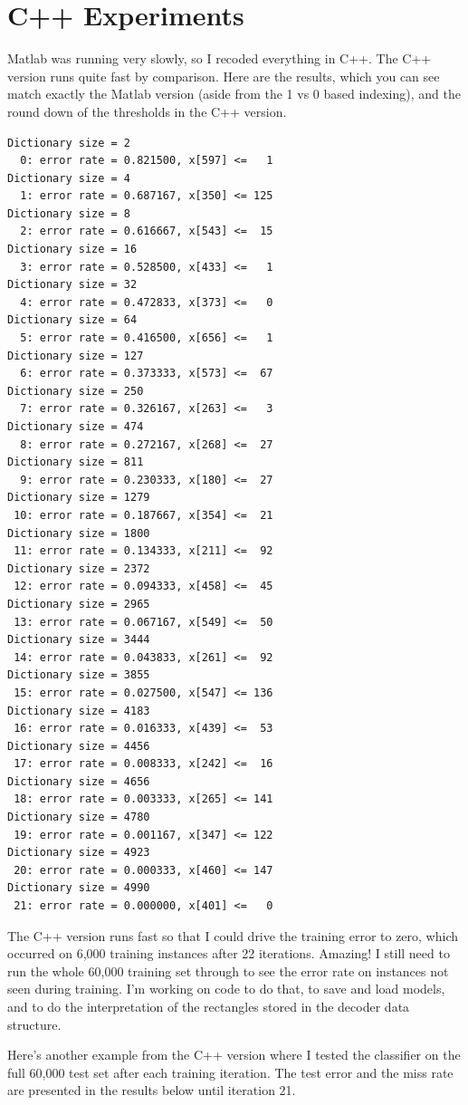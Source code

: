 \documentclass{article}
\begin{document}
\section{C++ Experiments}

Matlab was running very slowly, so I recoded everything in C++.  The C++ version runs quite fast by comparison.  Here are the results, which you can see match exactly the Matlab version (aside from the 1 vs 0 based indexing), and the round down of the thresholds in the C++ version.

\begin{verbatim}
Dictionary size = 2
  0: error rate = 0.821500, x[597] <=   1
Dictionary size = 4
  1: error rate = 0.687167, x[350] <= 125
Dictionary size = 8
  2: error rate = 0.616667, x[543] <=  15
Dictionary size = 16
  3: error rate = 0.528500, x[433] <=   1
Dictionary size = 32
  4: error rate = 0.472833, x[373] <=   0
Dictionary size = 64
  5: error rate = 0.416500, x[656] <=   1
Dictionary size = 127
  6: error rate = 0.373333, x[573] <=  67
Dictionary size = 250
  7: error rate = 0.326167, x[263] <=   3
Dictionary size = 474
  8: error rate = 0.272167, x[268] <=  27
Dictionary size = 811
  9: error rate = 0.230333, x[180] <=  27
Dictionary size = 1279
 10: error rate = 0.187667, x[354] <=  21
Dictionary size = 1800
 11: error rate = 0.134333, x[211] <=  92
Dictionary size = 2372
 12: error rate = 0.094333, x[458] <=  45
Dictionary size = 2965
 13: error rate = 0.067167, x[549] <=  50
Dictionary size = 3444
 14: error rate = 0.043833, x[261] <=  92
Dictionary size = 3855
 15: error rate = 0.027500, x[547] <= 136
Dictionary size = 4183
 16: error rate = 0.016333, x[439] <=  53
Dictionary size = 4456
 17: error rate = 0.008333, x[242] <=  16
Dictionary size = 4656
 18: error rate = 0.003333, x[265] <= 141
Dictionary size = 4780
 19: error rate = 0.001167, x[347] <= 122
Dictionary size = 4923
 20: error rate = 0.000333, x[460] <= 147
Dictionary size = 4990
 21: error rate = 0.000000, x[401] <=   0
\end{verbatim}

The C++ version runs fast so that I could drive the training error to zero, which occurred on 6,000 training instances after 22 iterations.  Amazing!   I still need to run the whole 60,000 training set through to see the error rate on instances not seen during training.  I'm working on code to do that, to save and load models, and to do the interpretation of the rectangles stored in the decoder data structure.

Here's another example from the C++ version where I tested the classifier on the full 60,000 test set after each training iteration.  The test error and the miss rate are presented in the results below until iteration 21.
\end{document}
